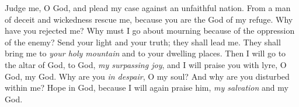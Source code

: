 \begin{biblechapter} %
 Judge me, O God, and plead my case 
against an unfaithful nation. 
From a man of deceit and wickedness rescue me,
\verse because you are the God of my refuge. 
Why have you rejected me? 
Why must I go about mourning 
because of the oppression of the enemy?
\verse Send your light and your truth; 
they shall lead me. 
They shall bring me to \textit{your holy mountain} 
and to your dwelling places.
\verse Then I will go to the altar of God, 
to God, \textit{my surpassing joy}, 
and I will praise you with lyre, 
O God, my God.
\verse Why are you \textit{in despair}, O my soul? 
And why are you disturbed within me? 
Hope in God, because I will again praise him, 
\textit{my salvation} and my God.
\end{biblechapter}

